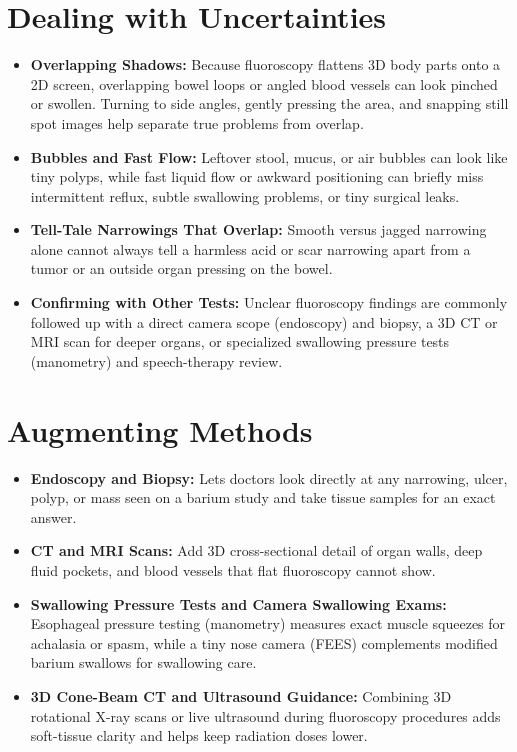 \section{Dealing with Uncertainties}

\begin{itemize}
    \item \textbf{Overlapping Shadows:} Because fluoroscopy flattens 3D body parts onto a 2D screen, overlapping bowel loops or angled blood vessels can look pinched or swollen. Turning to side angles, gently pressing the area, and snapping still spot images help separate true problems from overlap.
    \item \textbf{Bubbles and Fast Flow:} Leftover stool, mucus, or air bubbles can look like tiny polyps, while fast liquid flow or awkward positioning can briefly miss intermittent reflux, subtle swallowing problems, or tiny surgical leaks.
    \item \textbf{Tell-Tale Narrowings That Overlap:} Smooth versus jagged narrowing alone cannot always tell a harmless acid or scar narrowing apart from a tumor or an outside organ pressing on the bowel.
    \item \textbf{Confirming with Other Tests:} Unclear fluoroscopy findings are commonly followed up with a direct camera scope (endoscopy) and biopsy, a 3D CT or MRI scan for deeper organs, or specialized swallowing pressure tests (manometry) and speech-therapy review.
\end{itemize}

\section{Augmenting Methods}

\begin{itemize}
    \item \textbf{Endoscopy and Biopsy:} Lets doctors look directly at any narrowing, ulcer, polyp, or mass seen on a barium study and take tissue samples for an exact answer.
    \item \textbf{CT and MRI Scans:} Add 3D cross-sectional detail of organ walls, deep fluid pockets, and blood vessels that flat fluoroscopy cannot show.
    \item \textbf{Swallowing Pressure Tests and Camera Swallowing Exams:} Esophageal pressure testing (manometry) measures exact muscle squeezes for achalasia or spasm, while a tiny nose camera (FEES) complements modified barium swallows for swallowing care.
    \item \textbf{3D Cone-Beam CT and Ultrasound Guidance:} Combining 3D rotational X-ray scans or live ultrasound during fluoroscopy procedures adds soft-tissue clarity and helps keep radiation doses lower.
\end{itemize}

